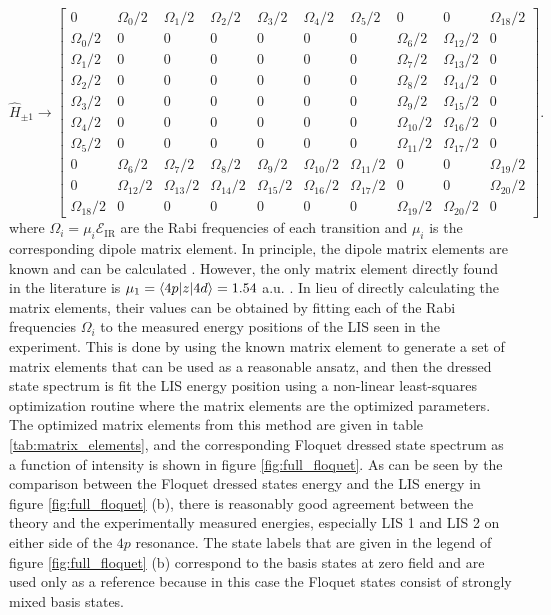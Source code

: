\begin{equation}
\hat{H}_{\pm 1} \rightarrow
\left[
\begin{matrix}%
0 & \Omega_0/2 & \Omega_1/2 & \Omega_2/2 & \Omega_3/2 & \Omega_4/2 & \Omega_5/2 & 0 & 0 & \Omega_{18}/2  \\
\Omega_0/2 & 0 & 0 & 0 & 0 & 0 & 0 & \Omega_6/2 & \Omega_{12}/2 & 0  \\
\Omega_1/2 & 0 & 0 & 0 & 0 & 0 & 0 & \Omega_7/2 & \Omega_{13}/2 & 0  \\
\Omega_2/2 & 0 & 0 & 0 & 0 & 0 & 0 & \Omega_8/2 & \Omega_{14}/2 & 0  \\
\Omega_3/2 & 0 & 0 & 0 & 0 & 0 & 0 & \Omega_9/2 & \Omega_{15}/2 & 0  \\
\Omega_4/2 & 0 & 0 & 0 & 0 & 0 & 0 & \Omega_{10}/2 & \Omega_{16}/2 & 0  \\
\Omega_5/2 & 0 & 0 & 0 & 0 & 0 & 0 & \Omega_{11}/2 & \Omega_{17}/2 & 0  \\
0 & \Omega_6/2 & \Omega_7/2 & \Omega_8/2 & \Omega_9/2 & \Omega_{10}/2 & \Omega_{11}/2 & 0 & 0 & \Omega_{19}/2  \\
0 & \Omega_{12}/2 & \Omega_{13}/2 & \Omega_{14}/2 & \Omega_{15}/2 & \Omega_{16}/2 & \Omega_{17}/2 & 0 & 0 & \Omega_{20}/2  \\
\Omega_{18}/2 & 0 & 0 & 0 & 0 & 0 & 0 & \Omega_{19}/2 & \Omega_{20}/2 & 0
\end{matrix}
\right].
\end{equation}
where $\Omega_{i}=\mu_i\mathcal{E}_{\mathrm{IR}}$ are the Rabi frequencies of each transition and $\mu_i$ is the corresponding dipole matrix element.  In principle, the dipole matrix elements are known and can be calculated \cite{tomaCalculationMatrixElements}.  However, the only matrix element directly found in the literature is $\mu_1 = \braket{4p|z|4d}=1.54$ a.u. \cite{wangFewCycleFemtosecondPulse2005, wangAttosecondTimeResolvedAutoionization2010}.  In lieu of directly calculating the matrix elements, their values can be obtained by fitting each of the Rabi frequencies $\Omega_{i}$ to the measured energy positions of the LIS seen in the experiment.  This is done by using the known matrix element to generate a set of matrix elements that can be used as a reasonable ansatz, and then the dressed state spectrum is fit the LIS energy position using a non-linear least-squares optimization routine where the matrix elements are the optimized parameters.  The optimized matrix elements from this method are given in table \ref{tab:matrix_elements}, and the corresponding Floquet dressed state spectrum as a function of intensity is shown in figure \ref{fig:full_floquet}.  As can be seen by the comparison between the Floquet dressed states energy and the LIS energy in figure \ref{fig:full_floquet} (b), there is reasonably good agreement between the theory and the experimentally measured energies, especially LIS 1 and LIS 2 on either side of the $4p$ resonance.  The state labels that are given in the legend of figure \ref{fig:full_floquet} (b) correspond to the basis states at zero field and are used only as a reference because in this case the Floquet states consist of strongly mixed basis states.

